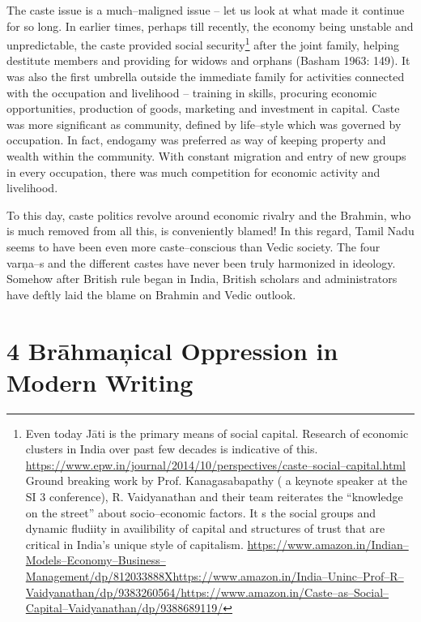 \vskip 2pt

The caste issue is a much–maligned issue – let us look at what made it continue for so long. In earlier times, perhaps till recently, the economy being unstable and unpredictable, the caste provided social security\footnote{Even today Jāti is the primary means of social capital. Research of economic clusters in India over past few decades is indicative of this. \url{https://www.epw.in/journal/2014/10/perspectives/caste–social–capital.html } Ground breaking work by Prof. Kanagasabapathy ( a keynote speaker at the SI 3 conference), R. Vaidyanathan and their team reiterates the “knowledge on the street” about socio–economic factors. It s the social groups and dynamic fludiity in availibility of capital and structures of trust that are critical in India’s unique style of capitalism. \url{https://www.amazon.in/Indian–Models–Economy–Business–Management/dp/812033888Xhttps://www.amazon.in/India–Uninc–Prof–R–Vaidyanathan/dp/9383260564/https://www.amazon.in/Caste–as–Social–Capital–Vaidyanathan/dp/9388689119/}} after the joint family, helping destitute members and providing for widows and orphans (Basham 1963: 149). It was also the first umbrella outside the immediate family for activities connected with the occupation and livelihood – training in skills, procuring economic opportunities, production of goods, marketing and investment in capital. Caste was more significant as community, defined by life–style which was governed by occupation. In fact, endogamy was preferred as way of keeping property and wealth within the community. With constant migration and entry of new groups in every occupation, there was much competition for economic activity and livelihood.

\vskip 2pt

To this day, caste politics revolve around economic rivalry and the Brahmin, who is much removed from all this, is conveniently blamed! In this regard, Tamil Nadu seems to have been even more caste–conscious than Vedic society. The four varņa–s and the different castes have never been truly harmonized in ideology. Somehow after British rule began in India, British scholars and administrators have deftly laid the blame on Brahmin and Vedic outlook.


\section*{4 Brāhmaņical Oppression in Modern Writing}

\vskip 2pt

